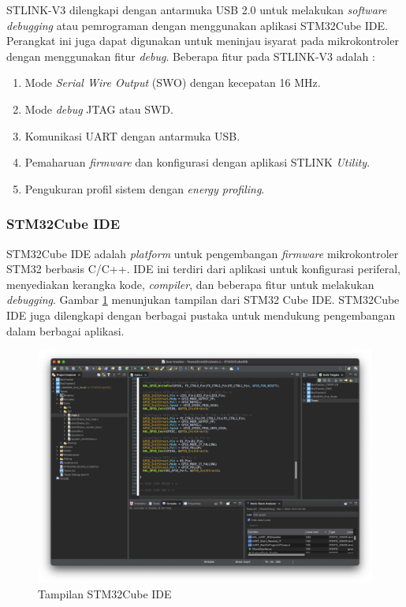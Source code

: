 STLINK-V3 dilengkapi dengan antarmuka USB 2.0 untuk melakukan \textit{software debugging} atau pemrograman dengan menggunakan aplikasi STM32Cube IDE. Perangkat ini juga dapat digunakan untuk meninjau isyarat pada mikrokontroler dengan menggunakan fitur \textit{debug}. Beberapa fitur pada STLINK-V3 adalah \cite{STMicroelectronics2023a}:

\begin{enumerate}
	\item Mode \textit{Serial Wire Output} (SWO) dengan kecepatan 16 MHz.
	\item Mode \textit{debug} JTAG atau SWD.
	\item Komunikasi UART dengan antarmuka USB.
	\item Pemaharuan \textit{firmware} dan konfigurasi dengan aplikasi STLINK \textit{Utility}.
	\item Pengukuran profil sistem dengan \textit{energy profiling}.
\end{enumerate}

\subsubsection{STM32Cube IDE}
STM32Cube IDE adalah \textit{platform} untuk pengembangan \textit{firmware} mikrokontroler STM32 berbasis C/C++. IDE ini terdiri dari aplikasi untuk konfigurasi periferal, menyediakan kerangka kode, \textit{compiler}, dan beberapa fitur untuk melakukan \textit{debugging}. Gambar \ref{Fig: stm32-ide} menunjukan tampilan dari STM32 Cube IDE. STM32Cube IDE juga dilengkapi dengan berbagai pustaka untuk mendukung pengembangan dalam berbagai aplikasi.

\begin{figure}[H]
	\centering
	\includegraphics[width=12cm]{contents/chapter-2/stm32-ide.png}
	\caption{Tampilan STM32Cube IDE}
	\label{Fig: stm32-ide}
\end{figure}

